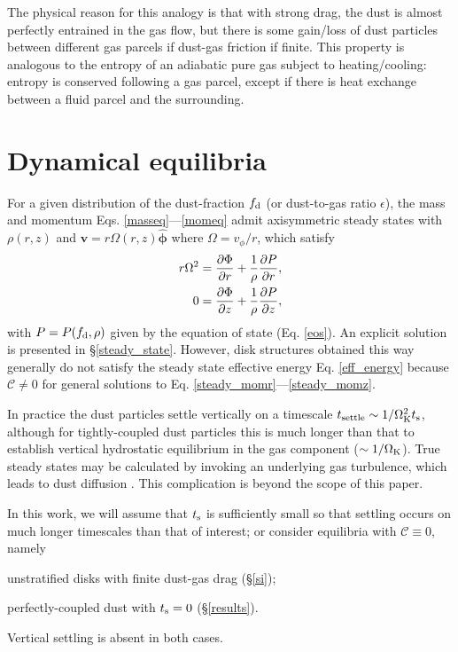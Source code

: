 The physical reason for this analogy is that with strong drag, the dust is almost
perfectly entrained in the gas flow, but there is some gain/loss of 
dust particles between different gas parcels if dust-gas
friction if finite. This property is analogous to the entropy of an adiabatic
pure gas subject to heating/cooling: entropy is conserved following
a gas parcel, except if there is heat exchange between a fluid parcel
and the surrounding.  

\section{Dynamical equilibria}\label{eqm}
 
For a given distribution of the dust-fraction $f_\mathrm{d}$ (or
dust-to-gas ratio $\epsilon$), the 
mass and momentum Eqs. \ref{masseq}---\ref{momeq} admit     
axisymmetric steady states with $\rho(r,z)$ and 
$\bm{v}=r\Omega(r,z)\hat{\bm{\phi}}$ where $\Omega = v_\phi/r$, which satisfy 
\begin{align}
  r\Omega^2 &= \frac{\partial \Phi}{\partial r} + \frac{1}{\rho}\frac{\partial P}{\partial
    r},\label{steady_momr}\\
  0 & = \frac{\partial\Phi}{\partial z} + \frac{1}{\rho}\frac{\partial P}{\partial z},\label{steady_momz}
\end{align}
with $P=P(f_\mathrm{d},\rho)$ given by the equation of state
(Eq. \ref{eos}). An explicit solution is presented in
\S\ref{steady_state}.  
However, disk structures obtained this way generally do not satisfy 
the steady state effective energy Eq. \ref{eff_energy} because
$\mathcal{C}\neq0$ for general solutions to
Eq. \ref{steady_momr}---\ref{steady_momz}. 

In practice the dust particles settle vertically on a timescale 
$t_\mathrm{settle}\sim 1/\Omega_{\rm K}^2t_\mathrm{s}$, although for tightly-coupled dust
particles this is much longer than that to establish vertical
hydrostatic equilibrium in the gas component ($\sim 1/\Omega_{\rm K}$).  
True steady states may be calculated by invoking an underlying gas
turbulence, which leads to dust diffusion \citep{takeuchi02, youdin07, 
 lyra13}. This complication is beyond the scope of this paper. 

In this work, we will assume that $t_\mathrm{s}$  is sufficiently small so
that settling occurs on much longer timescales  than that of interest; or
consider equilibria with $\mathcal{C}\equiv 0$, namely   
\begin{inparaenum}[1)] 
\item 
  unstratified disks with finite dust-gas drag (\S\ref{si});  
\item 
  perfectly-coupled dust with $t_\mathrm{s}=0$ (\S\ref{results}). 
\end{inparaenum} 
Vertical settling is absent in both cases. 


